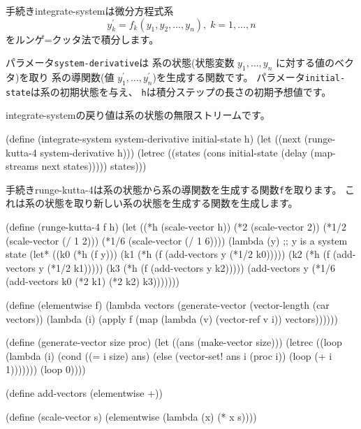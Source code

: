

\nobreak
手続き{\cf integrate-system}は微分方程式系
$$y_k^\prime = f_k(y_1, y_2, \ldots, y_n), \; k = 1, \ldots, n$$
をルンゲ=クッタ法で積分します。

パラメータ{\tt system-derivative}は
系の状態(状態変数 $y_1, \ldots, y_n$ に対する値のベクタ)を取り
系の導関数(値 $y_1^\prime, \ldots, y_n^\prime$)を生成する関数です。
パラメータ{\tt initial-state}は系の初期状態を与え、
{\tt h}は積分ステップの長さの初期予想値です。

{\cf integrate-system}の戻り値は系の状態の無限ストリームです。

\begin{schemenoindent}
(define (integrate-system system-derivative
                          initial-state
                          h)
  (let ((next (runge-kutta-4 system-derivative h)))
    (letrec ((states
              (cons initial-state
                    (delay (map-streams next
                                        states)))))
      states)))%
\end{schemenoindent}

手続き{\cf runge-kutta-4}は系の状態から系の導関数を生成する関数{\tt f}を取ります。
これは系の状態を取り新しい系の状態を生成する関数を生成します。

\begin{schemenoindent}
(define (runge-kutta-4 f h)
  (let ((*h (scale-vector h))
        (*2 (scale-vector 2))
        (*1/2 (scale-vector (/ 1 2)))
        (*1/6 (scale-vector (/ 1 6))))
    (lambda (y)
      ;; y is a system state
      (let* ((k0 (*h (f y)))
             (k1 (*h (f (add-vectors y (*1/2 k0)))))
             (k2 (*h (f (add-vectors y (*1/2 k1)))))
             (k3 (*h (f (add-vectors y k2)))))
        (add-vectors y
          (*1/6 (add-vectors k0
                             (*2 k1)
                             (*2 k2)
                             k3)))))))

(define (elementwise f)
  (lambda vectors
    (generate-vector
     (vector-length (car vectors))
     (lambda (i)
       (apply f
              (map (lambda (v) (vector-ref  v i))
                   vectors))))))

(define (generate-vector size proc)
  (let ((ans (make-vector size)))
    (letrec ((loop
              (lambda (i)
                (cond ((= i size) ans)
                      (else
                       (vector-set! ans i (proc i))
                       (loop (+ i 1)))))))
      (loop 0))))

(define add-vectors (elementwise +))

(define (scale-vector s)
  (elementwise (lambda (x) (* x s))))%
\end{schemenoindent}

